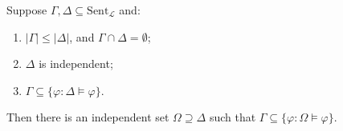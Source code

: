 Suppose $\Gamma, \Delta \subseteq \text{Sent}_{\mathcal{L}}$ and:
\begin{enumerate}
\item[(i)] $|\Gamma| \leq |\Delta|$, and $\Gamma \cap \Delta = \emptyset$;
\item[(ii)] $\Delta$ is independent;
\item[(iii)] $\Gamma \subseteq \{\varphi : \Delta \models \varphi\}$.
\end{enumerate}
Then there is an independent set $\Omega \supseteq \Delta$ such that $\Gamma \subseteq \{\varphi : \Omega \models \varphi\}$.
